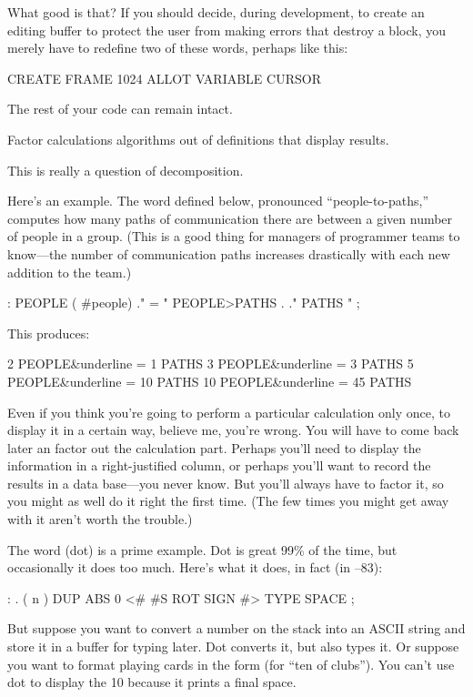 What good is that? If you should decide, during development, to create
an editing buffer to protect the user from making errors that destroy
a block, you merely have to redefine two of these words, perhaps like
this:

\begin{Code}
CREATE FRAME  1024 ALLOT
VARIABLE CURSOR
\end{Code}
The rest of your code can remain intact. 

\begin{tip}
Factor calculations algorithms out of definitions that display results.
\end{tip}
This is really a question of decomposition.

Here's an example. The word defined below, pronounced
``people-to-paths,'' computes how many paths of communication there are
between a given number of people in a group. (This is a good thing for
managers of programmer teams to know---the number of communication
paths increases drastically with each new addition to the team.)

\begin{Code}
: PEOPLE  ( #people)
    ." = "  PEOPLE>PATHS  .  ." PATHS " ;
\end{Code}
This produces:
\begin{Code}[commandchars=\&\{\}]
2 PEOPLE&underline{ = 1 PATHS}
3 PEOPLE&underline{ = 3 PATHS}
5 PEOPLE&underline{ = 10 PATHS}
10 PEOPLE&underline{ = 45 PATHS}
\end{Code}
Even if you think you're going to perform a particular calculation
only once, to display it in a certain way, believe me, you're wrong.
You will have to come back later an factor out the calculation part.
Perhaps you'll need to display the information in a right-justified
column, or perhaps you'll want to record the results in a data
base---you never know. But you'll always have to factor it, so you
might as well do it right the first time. (The few times you might get
away with it aren't worth the trouble.)

The word  (dot) is a prime example. Dot is great 99\% of the
time, but occasionally it does too much. Here's what it does, in fact
(in \Forth{}--83):

\begin{Code}
: .   ( n )  DUP ABS 0 <# #S  ROT SIGN  #> TYPE SPACE ;
\end{Code}
But suppose you want to convert a number on the stack into an ASCII
string and store it in a buffer for typing later. Dot converts it, but
also types it. Or suppose you want to format playing cards in the form
 (for ``ten of clubs''). You can't use dot to display the 10
because it prints a final space.

